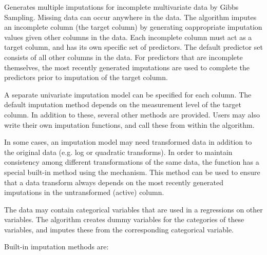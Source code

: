 \begin{Details}\relax
Generates multiple imputations for incomplete multivariate data by Gibbs
Sampling. Missing data can occur anywhere in the data. The algorithm
imputes an incomplete column (the target column) by generating
oappropriate imputation values given other columns in the data. Each
incomplete column must act as a target column, and has its own specific
set of predictors. The default predictor set consists of all other
columns in the data. For predictors that are incomplete themselves, the
most recently generated imputations are used to complete the predictors
prior to imputation of the target column. 

A separate univariate imputation model can be specified for each
column. The default imputation method depends on the measurement level
of the target column. In addition to these, several other methods are
provided. Users may also write their own imputation functions, and call
these from within the algorithm. 

In some cases, an imputation model may need transformed data in addition
to the original data (e.g. log or quadratic transforms). In order to
maintain consistency among different transformations of the same data,
the function has a special built-in method using the \code{\textasciitilde{}} mechanism. This
method can be used to ensure that a data transform always depends on the
most recently generated imputations in the untransformed (active)
column.  

The data may contain categorical variables that are used in a
regressions on other variables. The algorithm creates dummy variables
for the categories of these variables, and imputes these from the
corresponding categorical variable. 

Built-in imputation methods are:


\end{Details}
